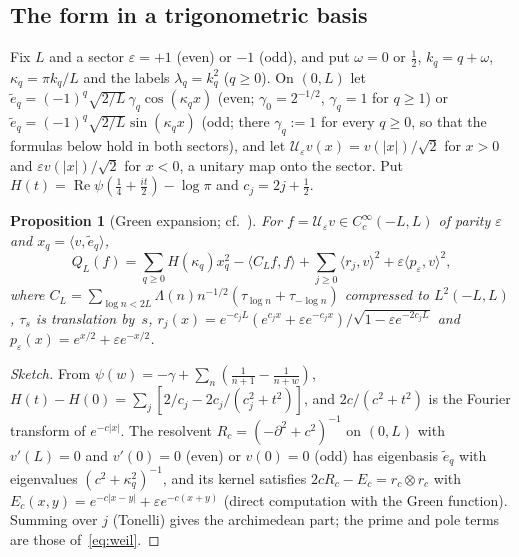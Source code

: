 \documentclass[11pt]{amsart}
\newcommand{\re}{\operatorname{Re}}
\newtheorem{proposition}[theorem]{Proposition}
\theoremstyle{definition}
\theoremstyle{remark}
\numberwithin{equation}{section}
\begin{document}
\subsection{The form in a trigonometric basis}\label{sec:piece4form}
Fix $L$ and a sector $\varepsilon=+1$ (even) or $-1$ (odd), and put $\omega=0$ or $\tfrac12$, $k_q=q+\omega$, $\kappa_q=\pi k_q/L$ and the labels $\lambda_q=k_q^2$ ($q\ge0$). On $(0,L)$ let $\tilde e_q=(-1)^q\sqrt{2/L}\,\gamma_q\cos(\kappa_qx)$ (even; $\gamma_0=2^{-1/2}$, $\gamma_q=1$ for $q\ge1$) or $\tilde e_q=(-1)^q\sqrt{2/L}\sin(\kappa_qx)$ (odd; there $\gamma_q:=1$ for every $q\ge0$, so that the formulas below hold in both sectors), and let $\mathcal U_\varepsilon v(x)=v(|x|)/\sqrt2$ for $x>0$ and $\varepsilon v(|x|)/\sqrt2$ for $x<0$, a unitary map onto the sector. Put $H(t)=\re\psi(\tfrac14+\tfrac{it}2)-\log\pi$ and $c_j=2j+\tfrac12$.

\begin{proposition}[Green expansion; cf.~{\cite[Lemma~3.1]{rh45}}]\label{prop:green}
For $f=\mathcal U_\varepsilon v\in C_c^\infty(-L,L)$ of parity $\varepsilon$ and $x_q=\langle v,\tilde e_q\rangle$,
\[
Q_L(f)=\sum_{q\ge0}H(\kappa_q)x_q^2-\langle C_Lf,f\rangle+\sum_{j\ge0}\langle r_j,v\rangle^2+\varepsilon\langle p_\varepsilon,v\rangle^2,
\]
where $C_L=\sum_{\log n<2L}\Lambda(n)n^{-1/2}(\tau_{\log n}+\tau_{-\log n})$ compressed to $L^2(-L,L)$, $\tau_s$ is translation by~$s$, $r_j(x)=e^{-c_jL}(e^{c_jx}+\varepsilon e^{-c_jx})/\sqrt{1-\varepsilon e^{-2c_jL}}$ and $p_\varepsilon(x)=e^{x/2}+\varepsilon e^{-x/2}$.
\end{proposition}
\begin{proof}[Sketch]
From $\psi(w)=-\gamma+\sum_n(\frac1{n+1}-\frac1{n+w})$, $H(t)-H(0)=\sum_j[2/c_j-2c_j/(c_j^2+t^2)]$, and $2c/(c^2+t^2)$ is the Fourier transform of $e^{-c|x|}$. The resolvent $R_c=(-\partial^2+c^2)^{-1}$ on $(0,L)$ with $v'(L)=0$ and $v'(0)=0$ (even) or $v(0)=0$ (odd) has eigenbasis $\tilde e_q$ with eigenvalues $(c^2+\kappa_q^2)^{-1}$, and its kernel satisfies $2cR_c-E_c=r_c\otimes r_c$ with $E_c(x,y)=e^{-c|x-y|}+\varepsilon e^{-c(x+y)}$ (direct computation with the Green function). Summing over $j$ (Tonelli) gives the archimedean part; the prime and pole terms are those of~\eqref{eq:weil}.
\end{proof}
\end{document}
